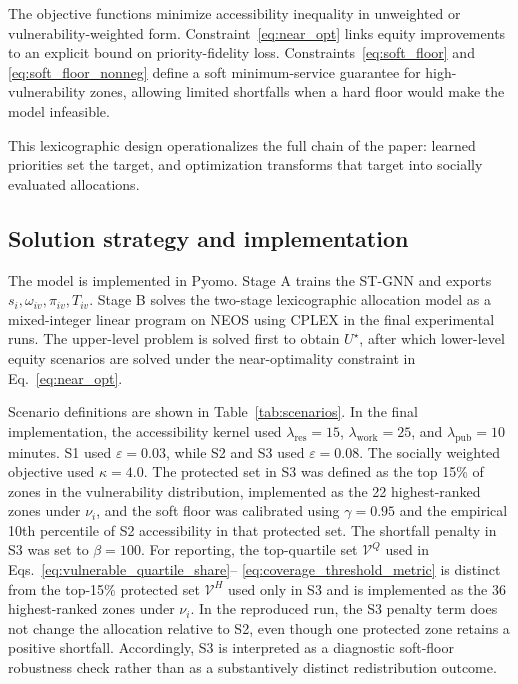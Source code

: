 \documentclass[final,5p,times,twocolumn,authoryear]{elsarticle}
\begin{document}
The objective functions minimize accessibility inequality in unweighted or
vulnerability-weighted form. Constraint~\eqref{eq:near_opt} links equity improvements to an
explicit bound on priority-fidelity loss. Constraints~\eqref{eq:soft_floor} and~
\eqref{eq:soft_floor_nonneg} define a soft minimum-service guarantee for high-vulnerability
zones, allowing limited shortfalls when a hard floor would make the model infeasible.

This lexicographic design operationalizes the full chain of the paper: learned priorities set
the target, and optimization transforms that target into socially evaluated allocations.

\subsection{Solution strategy and implementation}

The model is implemented in Pyomo. Stage A trains the ST-GNN and exports
${s_i,\omega_{iv},\pi_{iv},T_{iv}}$. Stage B solves the two-stage lexicographic allocation
model as a mixed-integer linear program on NEOS using CPLEX in the final experimental runs.
The upper-level problem is solved first to obtain $U^{\star}$, after which lower-level
equity scenarios are solved under the near-optimality constraint in
Eq.~\eqref{eq:near_opt}.

Scenario definitions are shown in Table~\ref{tab:scenarios}. In the final implementation,
the accessibility kernel used $\lambda_{\mathrm{res}}=15$, $\lambda_{\mathrm{work}}=25$, and
$\lambda_{\mathrm{pub}}=10$ minutes. S1 used $\varepsilon=0.03$, while S2 and S3 used
$\varepsilon=0.08$. The socially weighted objective used $\kappa=4.0$. The protected set in
S3 was defined as the top 15\% of zones in the vulnerability distribution, implemented as the
22 highest-ranked zones under $\nu_i$, and the soft floor was calibrated using
$\gamma=0.95$ and the empirical 10th percentile of S2 accessibility in that protected set.
The shortfall penalty in S3 was set to $\beta=100$. For reporting, the top-quartile set
$\mathcal{V}^{Q}$ used in Eqs.~\eqref{eq:vulnerable_quartile_share}--
\eqref{eq:coverage_threshold_metric} is distinct from the top-15\% protected set
$\mathcal{V}^{H}$ used only in S3 and is implemented as the 36 highest-ranked zones under
$\nu_i$. In the reproduced run, the S3 penalty term does not change the allocation
relative to S2, even though one protected zone retains a positive shortfall.
Accordingly, S3 is interpreted as a diagnostic soft-floor robustness check rather than as a
substantively distinct redistribution outcome.
\end{document}
